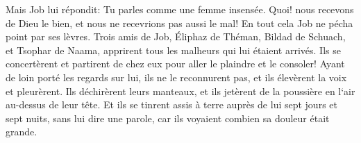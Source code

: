 \verse Mais Job lui répondit: Tu parles comme une femme insensée. Quoi! nous recevons de Dieu le bien, et nous ne recevrions pas aussi le mal! En tout cela Job ne pécha point par ses lèvres. 
\verse Trois amis de Job, Éliphaz de Théman, Bildad de Schuach, et Tsophar de Naama, apprirent tous les malheurs qui lui étaient arrivés. Ils se concertèrent et partirent de chez eux pour aller le plaindre et le consoler! 
\verse Ayant de loin porté les regards sur lui, ils ne le reconnurent pas, et ils élevèrent la voix et pleurèrent. Ils déchirèrent leurs manteaux, et ils jetèrent de la poussière en l`air au-dessus de leur tête. 
\verse Et ils se tinrent assis à terre auprès de lui sept jours et sept nuits, sans lui dire une parole, car ils voyaient combien sa douleur était grande. 

\chapter{}

